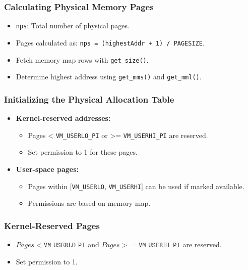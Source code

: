 \documentclass{beamer}
\begin{document}
	\begin{frame}
		\frametitle{Calculating Physical Memory Pages}
		\begin{itemize}
			\item \texttt{nps}: Total number of physical pages.
			\item Pages calculated as: \texttt{nps = (highestAddr + 1) / PAGESIZE}.
			\item Fetch memory map rows with \texttt{get\_size()}.
			\item Determine highest address using \texttt{get\_mms()} and \texttt{get\_mml()}.
		\end{itemize}
	\end{frame}
	
	\begin{frame}
		\frametitle{Initializing the Physical Allocation Table}
		\begin{itemize}
			\item \textbf{Kernel-reserved addresses:}
			\begin{itemize}
				\item Pages < \texttt{VM\_USERLO\_PI} or >= \texttt{VM\_USERHI\_PI} are reserved.
				\item Set permission to 1 for these pages.
			\end{itemize}
			\item \textbf{User-space pages:}
			\begin{itemize}
				\item Pages within [\texttt{VM\_USERLO}, \texttt{VM\_USERHI}] can be used if marked available.
				\item Permissions are based on memory map.
			\end{itemize}
		\end{itemize}
	\end{frame}
	
	\begin{frame}
		\frametitle{Kernel-Reserved Pages}
		\begin{itemize}
			\item $Pages < \texttt{VM\_USERLO\_PI}$ and $Pages >= \texttt{VM\_USERHI\_PI}$ are reserved.
			\item Set permission to 1.
		\end{itemize}
		
	\end{frame}
	
\end{document}
